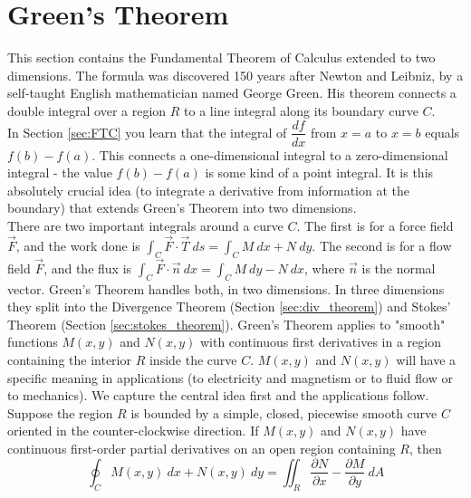 \section{Green's Theorem}\label{sec:greens_theorem}

This section contains the Fundamental Theorem of Calculus extended to two dimensions. The formula was discovered 150 years after Newton and Leibniz, by a self-taught English mathematician named George Green. His theorem connects a double integral over a region $R$ to a line integral along its boundary curve $C$.\\

In Section \ref{sec:FTC} you learn that the integral of $\dfrac{df}{dx}$ from $x=a$ to $x=b$ equals $f(b) - f (a)$. This connects a one-dimensional integral to a zero-dimensional integral - the value $f(b) - f(a)$ is some kind of a point integral. It is this absolutely crucial idea (to integrate a derivative from information at the boundary) that extends Green's Theorem into two dimensions.\\

There are two important integrals around a curve $C$. The first is for a force field $\vec F$, and the work done is $\displaystyle\int_C \vec F \cdot \vec T \: ds = \displaystyle\int_C M \: dx + N \: dy.$  The second is for a flow field $\vec F$, and the flux is $\displaystyle\int_C \vec F \cdot \vec n \: dx = \displaystyle\int_C M \: dy - N \: dx$, where $\vec n$ is the normal vector. Green's Theorem handles both, in two dimensions. In three dimensions they split into the Divergence Theorem (Section \ref{sec:div_theorem}) and Stokes' Theorem (Section \ref{sec:stokes_theorem}). Green's Theorem applies to "smooth" functions $M(x, y)$ and $N(x, y)$ with continuous first derivatives in a region containing the interior $R$ inside the curve $C$. $M(x,y)$ and $N(x,y)$ will have a specific meaning in applications (to electricity and magnetism or to fluid flow or to mechanics). We capture the central idea first and the applications follow.\\

{Suppose the region $R$ is bounded by a simple, closed, piecewise smooth curve $C$ oriented in the counter-clockwise direction. If $M(x,y)$ and $N(x,y)$ have continuous first-order partial derivatives on an open region containing $R$, then
$$\oint_C M(x,y) \: dx + N(x,y) \: dy = \iint_R \dfrac{\partial N}{\partial x} - \dfrac{\partial M}{\partial y} \: dA$$
}\\

